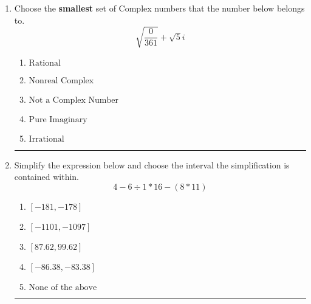 \documentclass[14pt]{extbook}
\newcommand{\litem}[1]{\item#1\hspace*{-1cm}\rule{\textwidth}{0.4pt}}
\begin{document}
\begin{enumerate}
{\begin{enumerate}[label=\Alph*.]
\end{enumerate} }
\litem{
Choose the \textbf{smallest} set of Complex numbers that the number below belongs to.\[ \sqrt{\frac{0}{361}}+\sqrt{5}i \]\begin{enumerate}[label=\Alph*.]
\item \( \text{Rational} \)
\item \( \text{Nonreal Complex} \)
\item \( \text{Not a Complex Number} \)
\item \( \text{Pure Imaginary} \)
\item \( \text{Irrational} \)

\end{enumerate} }
\litem{
Simplify the expression below and choose the interval the simplification is contained within.\[ 4 - 6 \div 1 * 16 - (8 * 11) \]\begin{enumerate}[label=\Alph*.]
\item \( [-181, -178] \)
\item \( [-1101, -1097] \)
\item \( [87.62, 99.62] \)
\item \( [-86.38, -83.38] \)
\item \( \text{None of the above} \)

\end{enumerate} }
\end{enumerate}
\end{document}
